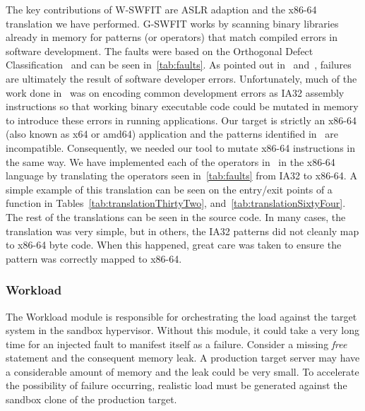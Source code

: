 The key contributions of W-SWFIT are ASLR adaption and the x86-64 translation
we have performed.  G-SWFIT works by scanning binary libraries already in
memory for patterns (or operators) that match compiled errors in software
development.  The faults were based on the Orthogonal Defect
Classification~\cite{bridge1998} and can be seen in~\ref{tab:faults}.  As
pointed out in~\cite{salfnerSurvey} and~\cite{gswfit}, failures are ultimately
the result of software developer errors.  Unfortunately, much of the work done
in~\cite{gswfit} was on encoding common development errors as IA32 assembly
instructions so that working binary executable code could be mutated in memory
to introduce these errors in running applications.  Our target is strictly an
x86-64 (also known as x64 or amd64) application and the patterns identified
in~\cite{gswfit} are incompatible.  Consequently, we needed our tool to mutate
x86-64 instructions in the same way.  We have implemented each of the operators
in~\cite{gswfit} in the x86-64 language by translating the operators seen
in~\ref{tab:faults} from IA32 to x86-64.  A simple example of this translation
can be seen on the entry/exit points of a function in
Tables~\ref{tab:translationThirtyTwo}, and~\ref{tab:translationSixtyFour}.  The
rest of the translations can be seen in the source code.  In many cases, the
translation was very simple, but in others, the IA32 patterns did not cleanly
map to x86-64 byte code.  When this happened, great care was taken to ensure
the pattern was correctly mapped to x86-64.

\tabFaults
\tabTranslationThirtyTwo
\tabTranslationSixtyFour

\subsubsection{Workload} \label{sec:workloadMgr} 
The Workload module is responsible for orchestrating the load against the
target system in the sandbox hypervisor.  Without this module, it could take a
very long time for an injected fault to manifest itself as a failure.  Consider
a missing \emph{free} statement and the consequent memory leak.  A production
target server may have a considerable amount of memory and the leak could be
very small.  To accelerate the possibility of failure occurring, realistic load
must be generated against the sandbox clone of the production target.

